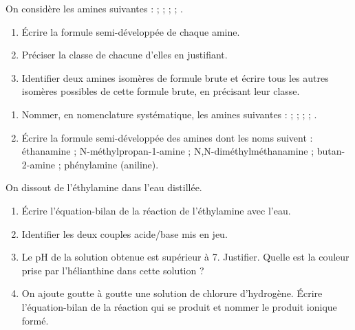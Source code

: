 \documentclass[11pt]{article}
\newcounter{popsec}
\newcounter{popsub}
\newcommand{\courssub}[1]{%
  \stepcounter{popsub}%
  \par\vspace{9pt}\noindent{\popxbold\fontsize{11.5}{13}\selectfont\color{popink}{\color{poporange}\thepopsec.\thepopsub}\hspace{6pt}#1}\par\nopagebreak\vspace{4pt}
}
\begin{document}
\courssub{Je m'entraîne}

\begin{exercice}
On considère les amines suivantes :
 ; \quad {} ; \quad {} ; \quad {} ; \quad {}.
\begin{enumerate}
\item Écrire la formule semi-développée de chaque amine.
\item Préciser la classe de chacune d'elles en justifiant.
\item Identifier deux amines isomères de formule brute  et écrire tous les autres isomères possibles de cette formule brute, en précisant leur classe.
\end{enumerate}
\end{exercice}

\begin{exercice}[Nomenclature]
\begin{enumerate}
\item Nommer, en nomenclature systématique, les amines suivantes :  ;  ;  ;  ; .
\item Écrire la formule semi-développée des amines dont les noms suivent : éthanamine ; N-méthylpropan-1-amine ; N,N-diméthylméthanamine ; butan-2-amine ; phénylamine (aniline).
\end{enumerate}
\end{exercice}

\begin{exercice}
On dissout de l'éthylamine  dans l'eau distillée.
\begin{enumerate}
\item Écrire l'équation-bilan de la réaction de l'éthylamine avec l'eau.
\item Identifier les deux couples acide/base mis en jeu.
\item Le pH de la solution obtenue est supérieur à 7. Justifier. Quelle est la couleur prise par l'hélianthine dans cette solution ?
\item On ajoute goutte à goutte une solution de chlorure d'hydrogène. Écrire l'équation-bilan de la réaction qui se produit et nommer le produit ionique formé.
\end{enumerate}
\end{exercice}
\end{document}
